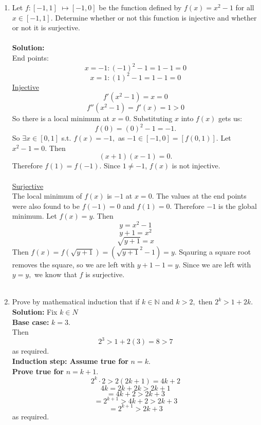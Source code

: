 \begin{enumerate}
    \item Let \(f : [−1, 1]\) \(\mapsto [−1, 0]\) be the function defined by
    \(f(x) = x^2 - 1\) for all \(x \in [−1, 1].\) Determine whether or not this function is injective and whether or not it is surjective.
    \\\\
    \textbf{Solution: } \\
    End points: 
    \[x = -1: (-1)^2 - 1= 1 - 1 = 0\]
    \[x = 1: (1)^2 - 1= 1 - 1 = 0\]
    \underline{Injective} \\
    \[f'(x^2 - 1) = x = 0\] %
    \[f''(x^2 - 1) = f'(x) = 1 > 0\] 
    So there is a local minimum at \(x = 0\). Substituting \(x\) into \(f(x)\) gets us:
    \[f(0) = (0)^2 - 1 = -1.\] 
    So \(\exists x \in [0, 1]\) s.t. \(f(x) = -1,\) as \(-1 \in [-1, 0] = [f(0, 1)].\) Let \(x^2 - 1 = 0.\) Then
    \[(x+1)(x-1) = 0.\] Therefore \(f(1) = f(-1).\) Since \(1 \ne -1\), \( f(x)\) is not injective.
    \\\\
    \underline{Surjective} \\
    The local minimum of \(f(x)\) is \(-1\) at \(x = 0\). The values at the end points were also found to be \(f(-1) = 0\) and \(f(1) = 0\). Therefore \(-1\) is the global minimum. Let \(f(x) = y.\) Then 
    \[y = x^2 - 1\]
    \[y + 1 = x^2\]
    \[\sqrt{y + 1} = x\]
    Then \(f(x) = f(\sqrt{y + 1}) = (\sqrt{y + 1}^2 - 1) = y.\) Sqauring a square root removes the square, so we are left with \(y + 1 - 1 = y.\) Since we are left with \(y = y,\) we know that \(f\) is surjective.
    \\\\
    \item Prove by mathematical induction that if \(k \in \mathbb{N} \) and \(k > 2,\) then \(2^k > 1 + 2k.\)\\
    \textbf{Solution:} Fix \(k \in N\)\\
    \textbf{Base case:} \(k = 3.\)\\
    Then 
    \[2^3 > 1 + 2(3) = 8 > 7\]
    as required.\\
    \textbf{Induction step: Assume true for} \(n = k.\)\\
    \textbf{Prove true for} \(n = k + 1.\)\\
    \[2^k \cdot 2 > 2(2k+1) = 4k+2\]
    \[4k = 2k + 2k > 2k + 1\]
    \[= 4k+2 > 2k+3\]
    \[= 2^{k+1} > 4k+2 > 2k+3\]
    \[= 2^{k+1} >2k+3\]
    as required.
    \\\\

\end{enumerate}
